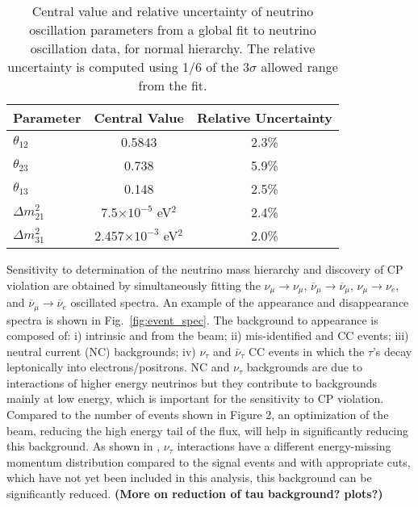 \begin{table}[!hb]
\begin{center}
\caption{Central value and relative uncertainty of neutrino oscillation 
  parameters from a global fit to neutrino oscillation data, for normal hierarchy. 
  The relative uncertainty is computed using 1/6 of the 3$\sigma$ allowed range from
  the fit.}
\label{tab:oscpar_nufit}
\begin{tabular}{l|c|c} \hline\hline
Parameter &    Central Value & Relative Uncertainty \\ \hline \hline
$\theta_{12}$ & 0.5843 & 2.3\% \\
$\theta_{23}$ & 0.738  & 5.9\% \\
$\theta_{13}$ & 0.148  & 2.5\% \\
$\Delta m^2_{21}$ & 7.5$\times10^{-5}$ eV$^2$ & 2.4\% \\
$\Delta m^2_{31}$ & 2.457$\times10^{-3}$ eV$^2$ &  2.0\% \\
\end{tabular}
\end{center}
\end{table}
%

%

Sensitivity to determination of the neutrino mass hierarchy and discovery
of CP violation are obtained by
simultaneously fitting the $\nu_\mu \rightarrow \nu_\mu$,
$\overline{\nu}_\mu \rightarrow \overline{\nu}_\mu$, $\nu_\mu \rightarrow \nu_e$, 
and  $\overline{\nu}_\mu \rightarrow \overline{\nu}_e$ oscillated spectra.
An example of the \nue appearance and \numu disappearance spectra is shown in 
Fig.~\ref{fig:event_spec}.
The background to \nue appearance is composed of: i) intrinsic \nue and \anue 
from the beam; ii) mis-identified \numu and \anumu CC events; 
iii) neutral current (NC) backgrounds; iv) $\nu_\tau$ and $\bar{\nu}_\tau$ CC events 
in which the $\tau$'s decay leptonically into electrons/positrons. NC and $\nu_\tau$ 
backgrounds are due to interactions of higher energy neutrinos but they contribute to 
backgrounds mainly at low energy, which is important for the sensitivity to CP violation. 
Compared to the number of events shown in Figure 2, an optimization of the beam, 
reducing the high energy tail of the flux, will help in significantly reducing this 
background. As shown in \cite{::2013kaa}, $\nu_\tau$ interactions 
have a different energy-missing 
momentum distribution compared to the signal events and with appropriate cuts, which have
not yet been included in this analysis, this background can be significantly reduced. {\bf(More on reduction of tau background? plots?)}

